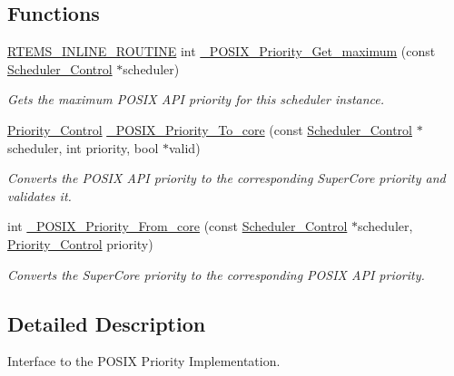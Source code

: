 \subsection*{Functions}
\begin{DoxyCompactItemize}
\item 
\mbox{\hyperlink{group__RTEMSScoreBaseDefs_gac216239df231d5dbd15e3520b0b9313f}{R\+T\+E\+M\+S\+\_\+\+I\+N\+L\+I\+N\+E\+\_\+\+R\+O\+U\+T\+I\+NE}} int \mbox{\hyperlink{group__POSIX__PRIORITY_ga3fbcaad724a60cf1caa7a176ca4ab616}{\+\_\+\+P\+O\+S\+I\+X\+\_\+\+Priority\+\_\+\+Get\+\_\+maximum}} (const \mbox{\hyperlink{struct__Scheduler__Control}{Scheduler\+\_\+\+Control}} $\ast$scheduler)
\begin{DoxyCompactList}\small\item\em Gets the maximum P\+O\+S\+IX A\+PI priority for this scheduler instance. \end{DoxyCompactList}\item 
\mbox{\hyperlink{group__RTEMSScorePriority_ga59d02b58072d31a9a1cfe644557aefe2}{Priority\+\_\+\+Control}} \mbox{\hyperlink{group__POSIX__PRIORITY_ga8d4f57e689b0cfaf1f4f2615cb7f08d0}{\+\_\+\+P\+O\+S\+I\+X\+\_\+\+Priority\+\_\+\+To\+\_\+core}} (const \mbox{\hyperlink{struct__Scheduler__Control}{Scheduler\+\_\+\+Control}} $\ast$scheduler, int priority, bool $\ast$valid)
\begin{DoxyCompactList}\small\item\em Converts the P\+O\+S\+IX A\+PI priority to the corresponding Super\+Core priority and validates it. \end{DoxyCompactList}\item 
int \mbox{\hyperlink{group__POSIX__PRIORITY_gad0693fb0599992826c0948cd9bda4d69}{\+\_\+\+P\+O\+S\+I\+X\+\_\+\+Priority\+\_\+\+From\+\_\+core}} (const \mbox{\hyperlink{struct__Scheduler__Control}{Scheduler\+\_\+\+Control}} $\ast$scheduler, \mbox{\hyperlink{group__RTEMSScorePriority_ga59d02b58072d31a9a1cfe644557aefe2}{Priority\+\_\+\+Control}} priority)
\begin{DoxyCompactList}\small\item\em Converts the Super\+Core priority to the corresponding P\+O\+S\+IX A\+PI priority. \end{DoxyCompactList}\end{DoxyCompactItemize}


\subsection{Detailed Description}
Interface to the P\+O\+S\+IX Priority Implementation. 



